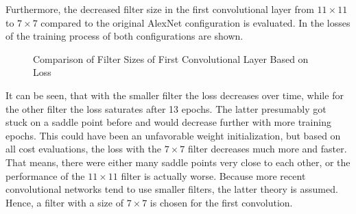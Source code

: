 Furthermore, the decreased filter size in the first convolutional layer from $11 \times 11$ to $7 \times 7$ compared to the original AlexNet configuration is evaluated.
In  the losses of the training process of both configurations are shown.
\begin{figure}
	\setlength{}
	\setlength{}
	\centering
	
	\caption{Comparison of Filter Sizes of First Convolutional Layer Based on Loss}
	\label{fig:first-conv-filter}
\end{figure}
It can be seen, that with the smaller filter the loss decreases over time, while for the other filter the loss saturates after 13 epochs.
The latter presumably got stuck on a saddle point before and would decrease further with more training epochs.
This could have been an unfavorable weight initialization, but based on all cost evaluations, the loss with the $7 \times 7$ filter decreases much more and faster.
That means, there were either many saddle points very close to each other, or the performance of the $11 \times 11$ filter is actually worse.
Because more recent convolutional networks tend to use smaller filters, the latter theory is assumed.
Hence, a filter with a size of $7 \times 7$ is chosen for the first convolution.

